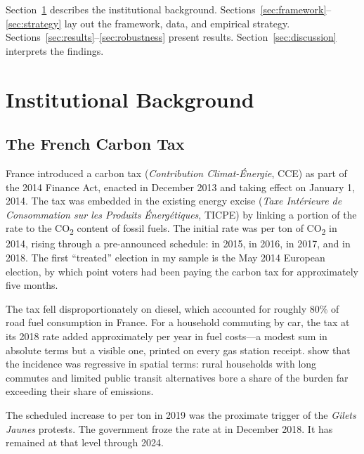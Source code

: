 \documentclass[12pt]{article}
\providecommand{\euro}{\texteuro}
\newcommand{\gj}{\textit{Gilets Jaunes}}
\begin{document}
Section~\ref{sec:background} describes the institutional background. Sections~\ref{sec:framework}--\ref{sec:strategy} lay out the framework, data, and empirical strategy. Sections~\ref{sec:results}--\ref{sec:robustness} present results. Section~\ref{sec:discussion} interprets the findings.



\section{Institutional Background}
\label{sec:background}

\subsection{The French Carbon Tax}

France introduced a carbon tax (\textit{Contribution Climat-\'{E}nergie}, CCE) as part of the 2014 Finance Act, enacted in December 2013 and taking effect on January 1, 2014. The tax was embedded in the existing energy excise (\textit{Taxe Int\'{e}rieure de Consommation sur les Produits \'{E}nerg\'{e}tiques}, TICPE) by linking a portion of the rate to the CO\textsubscript{2} content of fossil fuels. The initial rate was \euro 7 per ton of CO\textsubscript{2} in 2014, rising through a pre-announced schedule: \euro 14.50 in 2015, \euro 22 in 2016, \euro 30.50 in 2017, and \euro 44.60 in 2018. The first ``treated'' election in my sample is the May 2014 European election, by which point voters had been paying the carbon tax for approximately five months.

The tax fell disproportionately on diesel, which accounted for roughly 80\% of road fuel consumption in France. For a household commuting by car, the tax at its 2018 rate added approximately \euro 120 per year in fuel costs---a modest sum in absolute terms but a visible one, printed on every gas station receipt. \citet{bureau2019distributional} show that the incidence was regressive in spatial terms: rural households with long commutes and limited public transit alternatives bore a share of the burden far exceeding their share of emissions.

The scheduled increase to \euro 55 per ton in 2019 was the proximate trigger of the \gj{} protests. The government froze the rate at \euro 44.60 in December 2018. It has remained at that level through 2024.
\end{document}
